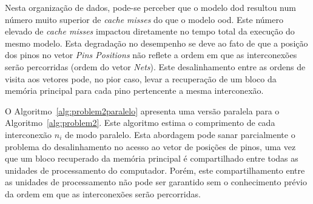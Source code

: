 
Nesta organização de dados, pode-se perceber que o modelo \ac{dod} resultou num número muito superior de  \textit{cache misses} do que o modelo \ac{ood}. Este número elevado de  \textit{cache misses} impactou diretamente no tempo total da execução do mesmo modelo.
Esta degradação no desempenho se deve ao fato de que a posição dos pinos no vetor \textit{Pins Positions} não reflete a ordem em que as interconexões serão percorridas (ordem do vetor \textit{Nets}). 
Este desalinhamento entre as ordens de visita aos vetores pode, no pior caso, levar a recuperação de um bloco da memória principal para cada pino pertencente a mesma interconexão.


O Algoritmo~\ref{alg:problem2paralelo} apresenta uma versão paralela para o Algoritmo~\ref{alg:problem2}.
Este algoritmo estima o comprimento de cada interconexão $n_i$ de modo paralelo. 
Esta abordagem pode sanar parcialmente o problema do desalinhamento no acesso ao vetor de posições de pinos, uma vez que um bloco recuperado da memória principal é compartilhado entre todas as unidades de processamento do computador.
Porém, este compartilhamento entre as unidades de processamento não pode ser garantido sem o conhecimento prévio da ordem em que as interconexões serão percorridas.

